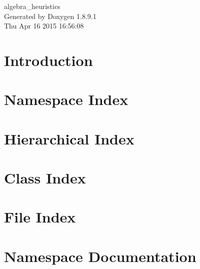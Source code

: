 \documentclass[twoside]{book}
\newcommand{\+}{\discretionary{\mbox{\scriptsize$\hookleftarrow$}}{}{}}
\newcommand{\clearemptydoublepage}{%
  \newpage{\pagestyle{empty}\cleardoublepage}%
}
\begin{document}
\hypersetup{pageanchor=false,
             bookmarks=true,
             bookmarksnumbered=true,
             pdfencoding=unicode
            }
\begin{titlepage}
\vspace*{7cm}
\begin{center}%
{\Large algebra\+\_\+heuristics }\\
\vspace*{1cm}
{\large Generated by Doxygen 1.8.9.1}\\
\vspace*{0.5cm}
{\small Thu Apr 16 2015 16:56:08}\\
\end{center}
\end{titlepage}
\clearemptydoublepage
\tableofcontents
\clearemptydoublepage
{}
\hypersetup{pageanchor=true}

\chapter{Introduction}
\label{md__r_e_a_d_m_e}
\hypertarget{md__r_e_a_d_m_e}{}

\chapter{Namespace Index}

\chapter{Hierarchical Index}

\chapter{Class Index}

\chapter{File Index}

\chapter{Namespace Documentation}














\end{document}
